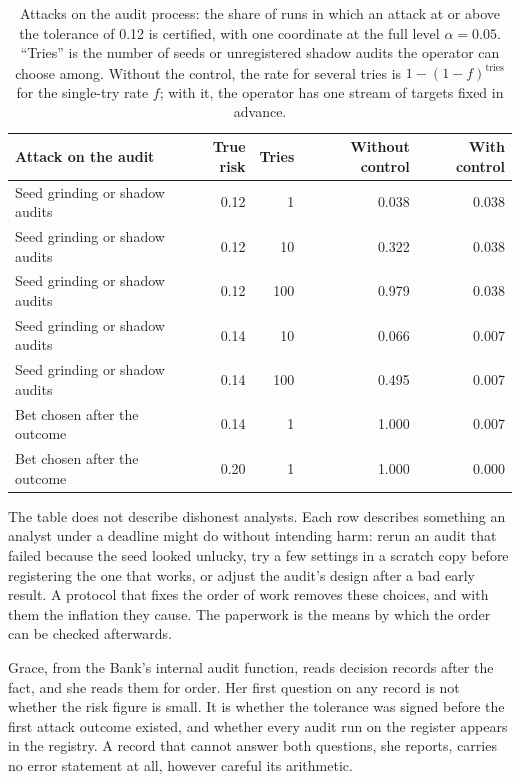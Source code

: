 \begin{table}[ht]
\centering
\small
\caption{Attacks on the audit process: the share of runs in which an attack at or
above the tolerance of 0.12 is certified, with one coordinate at the full level
$\alpha = 0.05$. ``Tries'' is the number of seeds or unregistered shadow audits the
operator can choose among. Without the control, the rate for several tries is
$1 - (1-f)^{\text{tries}}$ for the single-try rate $f$; with it, the operator has one
stream of targets fixed in advance.}
\label{c16:tab-process}
\begin{tabular}{lrrrr}
\toprule
Attack on the audit & True risk & Tries & Without control & With control \\
\midrule
Seed grinding or shadow audits & 0.12 & 1 & 0.038 & 0.038 \\
Seed grinding or shadow audits & 0.12 & 10 & 0.322 & 0.038 \\
Seed grinding or shadow audits & 0.12 & 100 & 0.979 & 0.038 \\
Seed grinding or shadow audits & 0.14 & 10 & 0.066 & 0.007 \\
Seed grinding or shadow audits & 0.14 & 100 & 0.495 & 0.007 \\
Bet chosen after the outcome & 0.14 & 1 & 1.000 & 0.007 \\
Bet chosen after the outcome & 0.20 & 1 & 1.000 & 0.000 \\
\bottomrule
\end{tabular}
\end{table}

The table does not describe dishonest analysts. Each row describes something an
analyst under a deadline might do without intending harm: rerun an audit that
failed because the seed looked unlucky, try a few settings in a scratch copy before
registering the one that works, or adjust the audit's design after a bad early
result. A protocol that fixes the order of work removes these choices, and with them
the inflation they cause. The paperwork is the means by which the order can be
checked afterwards.

Grace, from the Bank's internal audit function, reads decision records after the
fact, and she reads them for order. Her first question on any record is not whether
the risk figure is small. It is whether the tolerance was signed before the first
attack outcome existed, and whether every audit run on the register appears in the
registry. A record that cannot answer both questions, she reports, carries no error
statement at all, however careful its arithmetic.

